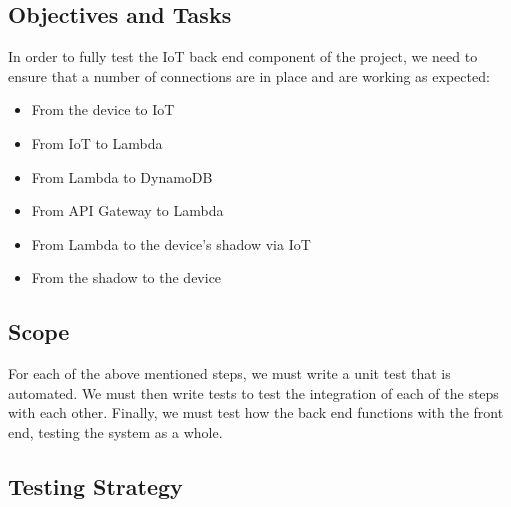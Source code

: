 \documentclass{article}
\begin{document}
	\subsection{Objectives and Tasks}
		In order to fully test the IoT back end component of the project, we need to ensure that a number of connections are in place and are working as expected:
		\begin{itemize}
			\item{From the device to IoT}
			\item{From IoT to Lambda}
			\item{From Lambda to DynamoDB}
			\\
			\item{From API Gateway to Lambda}
			\item{From Lambda to the device's shadow via IoT}
			\item{From the shadow to the device}
		\end{itemize}
	
	\subsection{Scope}
		For each of the above mentioned steps, we must write a unit test that is automated. We must then write tests to test
		the integration of each of the steps with each other. Finally, we must test how the back end functions with the front
		end, testing the system as a whole.
	
	\subsection{Testing Strategy}
\end{document}
